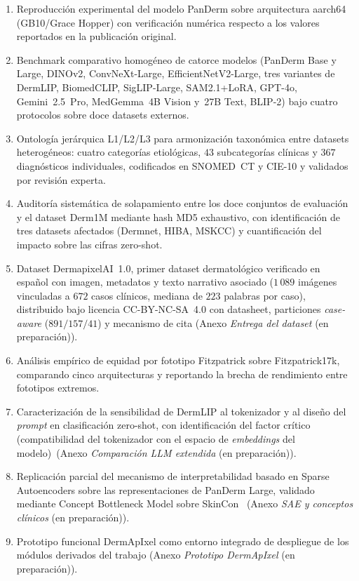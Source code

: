 \begin{enumerate}
\item Reproducción experimental del modelo PanDerm sobre
arquitectura aarch64 (GB10/Grace Hopper) con verificación numérica
respecto a los valores reportados en la publicación original.

\item Benchmark comparativo homogéneo de catorce modelos (PanDerm
Base y Large, DINOv2, ConvNeXt-Large, EfficientNetV2-Large, tres
variantes de DermLIP, BiomedCLIP, SigLIP-Large, SAM2.1+LoRA, GPT-4o,
Gemini~2.5~Pro, MedGemma~4B Vision y~27B Text, BLIP-2) bajo cuatro
protocolos sobre doce datasets externos.

\item Ontología jerárquica L1/L2/L3 para armonización taxonómica
entre datasets heterogéneos: cuatro categorías etiológicas,
$43$ subcategorías clínicas y $367$ diagnósticos
individuales, codificados en SNOMED~CT y CIE-10 y validados por
revisión experta.

\item Auditoría sistemática de solapamiento entre los doce
conjuntos de evaluación y el dataset Derm1M mediante hash MD5
exhaustivo, con identificación de tres datasets afectados
(Dermnet, HIBA, MSKCC) y cuantificación del impacto sobre las
cifras zero-shot.

\item Dataset DermapixelAI~1.0, primer dataset dermatológico
verificado en español con imagen, metadatos y texto narrativo
asociado ($1\,089$ imágenes vinculadas a $672$ casos clínicos,
mediana de $223$ palabras por caso), distribuido bajo licencia
CC-BY-NC-SA~4.0 con datasheet, particiones \emph{case-aware}
($891 / 157 / 41$) y mecanismo de cita
(Anexo \emph{Entrega del dataset} (en preparación)).

\item Análisis empírico de equidad por fototipo Fitzpatrick sobre
Fitzpatrick17k, comparando cinco arquitecturas y reportando la
brecha de rendimiento entre fototipos extremos.

\item Caracterización de la sensibilidad de DermLIP al tokenizador
y al diseño del \emph{prompt} en clasificación zero-shot, con
identificación del factor crítico (compatibilidad del tokenizador
con el espacio de \emph{embeddings} del modelo)~(Anexo \emph{Comparación LLM extendida} (en preparación)).

\item Replicación parcial del mecanismo de interpretabilidad
basado en Sparse Autoencoders sobre las representaciones de PanDerm
Large, validado mediante Concept Bottleneck Model sobre
SkinCon~\cite{skincon} (Anexo \emph{SAE y conceptos clínicos} (en preparación)).

\item Prototipo funcional DermApIxel como entorno integrado de
despliegue de los módulos derivados del trabajo
(Anexo \emph{Prototipo DermApIxel} (en preparación)).
\end{enumerate}

